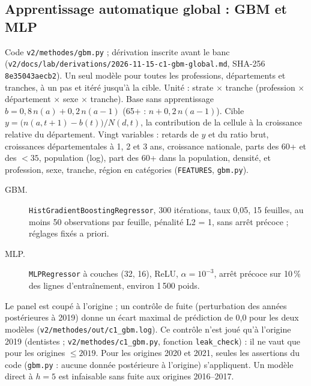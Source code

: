 \subsection{Apprentissage automatique global : GBM et MLP}
\label{met:gbm}
Code \texttt{v2/methodes/gbm.py} ; dérivation inscrite avant le banc
(\texttt{v2/docs/lab/derivations/2026-11-15-c1-gbm-global.md}, SHA-256 \texttt{8e35043aecb2}). Un seul
modèle pour toutes les professions, départements et tranches, à un pas et itéré jusqu'à la cible. Unité :
strate $\times$ tranche (profession $\times$ département $\times$ sexe $\times$ tranche). Base sans apprentissage
$b = 0{,}8\,n(a) + 0{,}2\,n(a-1)$ (65+ : $n + 0{,}2\,n(a-1)$). Cible
$y = \big(n(a,t+1) - b(t)\big)/N(d,t)$, la contribution de la cellule à la croissance relative du
département. Vingt variables : retards de $y$ et du ratio brut, croissances départementales à 1, 2 et 3 ans,
croissance nationale, parts des 60+ et des $<35$, population (log), part des 60+ dans la population,
densité, et profession, sexe, tranche, région en catégories (\texttt{FEATURES}, \texttt{gbm.py}).
\begin{description}
  \item[GBM.] \texttt{HistGradientBoostingRegressor}, 300 itérations, taux 0,05, 15 feuilles, au moins 50
    observations par feuille, pénalité L2 = 1, sans arrêt précoce ; réglages fixés a priori\suppose.
  \item[MLP.] \texttt{MLPRegressor} à couches (32, 16), ReLU, $\alpha = 10^{-3}$, arrêt précoce sur 10\,\% des
    lignes d'entraînement, environ 1\,500\derive{} poids.
\end{description}
Le panel est coupé à l'origine ; un contrôle de fuite (perturbation des années postérieures à 2019) donne
un écart maximal de prédiction de 0,0\mesure{} pour les deux modèles (\texttt{v2/methodes/out/c1\_gbm.log}).
Ce contrôle n'est joué qu'à l'origine 2019 (dentistes ; \texttt{v2/methodes/c1\_gbm.py}, fonction
\texttt{leak\_check}) : il ne vaut que pour les origines $\le 2019$. Pour les origines 2020 et 2021, seules
les assertions du code (\texttt{gbm.py} : aucune donnée postérieure à l'origine) s'appliquent.
Un modèle direct à $h = 5$ est infaisable sans fuite aux origines 2016--2017\derive.

